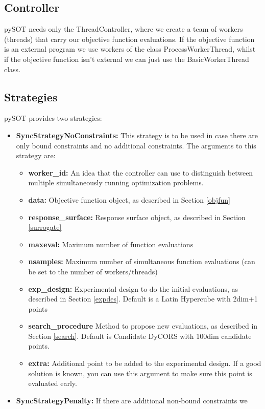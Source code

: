 \documentclass[]{article}
\begin{document}
\subsection{Controller} pySOT needs only the ThreadController, where we create 
a team of workers (threads) that carry our objective function evaluations. If the 
objective function is an external program we use workers of the class 
ProcessWorkerThread, whilst if the objective function isn't external we can just 
use the BasicWorkerThread class.

\subsection{Strategies} pySOT provides two strategies:
\begin{itemize}
\item \textbf{SyncStrategyNoConstraints:} This strategy is to be used in case 
there are only bound constraints and no additional constraints. The arguments 
to this strategy are:
\begin{itemize}
\item \textbf{worker\_id:} An idea that the controller can use to distinguish between 
multiple simultaneously running optimization problems.
\item \textbf{data:} Objective function object, as described in Section \ref{objfun}
\item \textbf{response\_surface:} Response surface object, as described in 
Section \ref{surrogate}
\item \textbf{maxeval:} Maximum number of function evaluations
\item \textbf{nsamples:} Maximum number of simultaneous function evaluations 
(can be set to the number of workers/threads)
\item \textbf{exp\_design:} Experimental design to do the initial evaluations, as 
described in Section \ref{expdes}. Default is a Latin Hypercube with 2dim+1 points
\item \textbf{search\_procedure} Method to propose new evaluations, as described in 
Section \ref{search}. Default is Candidate DyCORS with 100dim candidate points.
\item \textbf{extra:} Additional point to be added to the experimental design. If a good 
solution is known, you can use this argument to make sure this point is evaluated early. 
\end{itemize}
\item \textbf{SyncStrategyPenalty:} If there are additional non-bound constraints we 

\end{itemize}
\end{document}
